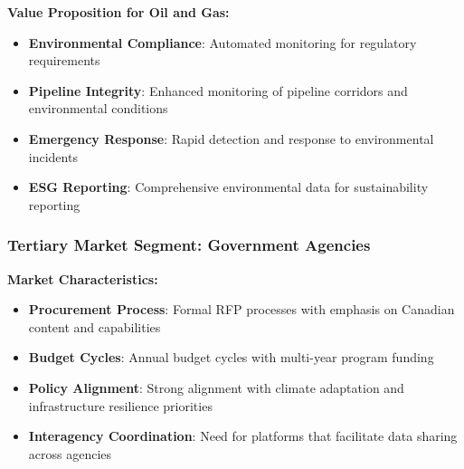 \textbf{Value Proposition for Oil and Gas:}
\begin{itemize}
    \item \textbf{Environmental Compliance}: Automated monitoring for regulatory requirements
    \item \textbf{Pipeline Integrity}: Enhanced monitoring of pipeline corridors and environmental conditions
    \item \textbf{Emergency Response}: Rapid detection and response to environmental incidents
    \item \textbf{ESG Reporting}: Comprehensive environmental data for sustainability reporting
\end{itemize}

\subsubsection{Tertiary Market Segment: Government Agencies}

\textbf{Market Characteristics:}
\begin{itemize}
    \item \textbf{Procurement Process}: Formal RFP processes with emphasis on Canadian content and capabilities
    \item \textbf{Budget Cycles}: Annual budget cycles with multi-year program funding
    \item \textbf{Policy Alignment}: Strong alignment with climate adaptation and infrastructure resilience priorities
    \item \textbf{Interagency Coordination}: Need for platforms that facilitate data sharing across agencies
\end{itemize}

